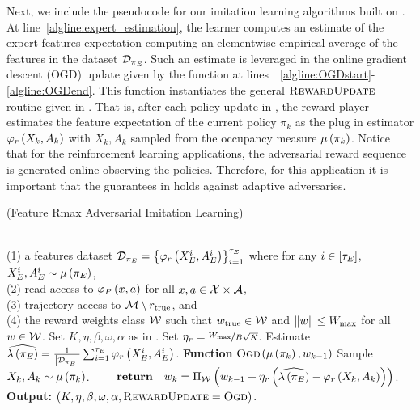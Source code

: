 \noindent Next, we include the pseudocode for our imitation learning algorithms built on \algname. At line~\ref{algline:expert_estimation}, the learner computes an estimate of the expert features expectation computing an elementwise empirical average of the features in the dataset $\mathcal{D}_{\pi_E}$. Such an estimate is leveraged in the online gradient descent (OGD) update given by the function at lines~~\ref{algline:OGDstart}-\ref{algline:OGDend}. This function instantiates the general $\textsc{RewardUpdate}$ routine given in . That is, after each policy update in \algname, the reward player estimates the feature expectation of the current policy $\pi_k$ as the plug in estimator $\varphi_r \left( X_k, A_k \right)$ with $X_k, A_k$ sampled from the occupancy measure $\mu \left( \pi_k \right)$. Notice that for the reinforcement learning applications, the adversarial reward sequence is generated online observing the policies. Therefore, for this application it is important that the guarantees in  holds against adaptive adversaries.
%
\begin{algorithm}[t]
  \caption{\FRAalg (Feature Rmax Adversarial Imitation Learning) \label{alg:fra}}
  \centering
  \begin{algorithmic}[1]
     \\
    (1) a features dataset $\mathcal{D}_{\pi_E} = \left\{ \varphi_r \left( X^i_E, A^i_E \right) \right\}^{\tau_E}_{i=1}$ where for any $i \in \left[ \tau_E \right]$, $X^i_E, A^i_E \sim \mu \left( {\pi_E} \right)$, \\
    (2) read access to $\varphi_P \left( x, a \right)$ for all $x, a \in \mathcal{X} \times \mathcal{A}$, \\
    (3) trajectory access to $\mathcal{M} \setminus r_{\textup{true}}$, and \\
    (4) the reward weights class $\mathcal{W}$ such that $w_{\mathrm{true}} \in \mathcal{W}$ and $\left\|w\right\| \leq W_{\max}$ for all $w \in \mathcal{W}$.
    \STATE Set $K, \eta, \beta, \omega, \alpha$ as in .
    \STATE Set $\eta_r = \nicefrac{W_{\max}}{B \sqrt{K}}$.
    \STATE Estimate $\widehat{\lambda \left( {\pi_E} \right)} = \frac{1}{\left|\mathcal{D}_{\pi_E}\right|} \sum^{\tau_E}_{i=1} \varphi_r \left( X_E^i, A_E^i \right)$. \label{algline:expert_estimation}
    \STATE \textbf{Function} \label{algline:OGDstart}{$\textsc{Ogd}$}{$\left( \mu \left( \pi_k \right), w_{k-1} \right)$}
    \STATE Sample $X_k, A_k \sim \mu \left( \pi_k \right)$.
    \STATE $\quad \quad \text{\textbf{return}} \quad w_k = \Pi_{\mathcal{W}} \left( w_{k-1} + \eta_r \left( \widehat{\lambda \left( {\pi_E} \right)} - \varphi_r \left( X_k, A_k \right) \right) \right)$. \label{algline:OGDend}
    \STATE \textbf{Output:}  \algname $\left( K, \eta, \beta, \omega, \alpha, \textsc{RewardUpdate} = \textsc{Ogd} \right)$.
  \end{algorithmic}
\end{algorithm}
